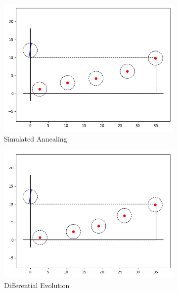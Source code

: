 \documentclass[12pt]{article}
\begin{document}
\begin{figure}
\centering
\begin{subfigure}{.33\textwidth}
    \centering
    \includegraphics[width=\textwidth]{annealing-layout.png}
    \caption{Simulated Annealing}
\end{subfigure}\hfil %
\begin{subfigure}{.33\textwidth}
    \includegraphics[width=\textwidth]{de-layout.png}
    \caption{Differential Evolution}
\end{subfigure}\hfil %
\begin{subfigure}{.33\textwidth}

\end{subfigure}
\end{figure}
\end{document}
